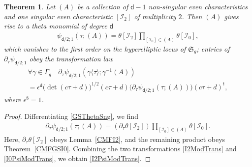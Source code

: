 \documentclass[twoside]{amsart}
\newcommand{\I}{\mathcal{I}}
\newcommand{\dd}{\textsf{d}}
\newtheorem{theo}{Theorem}[section]
\theoremstyle{definition}
\theoremstyle{plain}
\begin{document}
\begin{theo}\label{CMFGSI2}
Let $(A)$ be a collection of $\dd-1$ non-singular even characteristics 
and one singular even characteristic $[\I_2]$ of multiplicity $2$. 
Then  $(A)$ gives rise to a theta monomial of degree $\dd$
\begin{gather}\label{GSThetaSng}
\psi_{\dd/2;1}(\tau; (A)) =  \theta[\I_2] \prod_{[\I_0] \in (A)} \theta[\I_0],
\end{gather}
which vanishes to the first order on the hyperelliptic locus of $\mathfrak{S}_g$;
entries of $\partial_{\tau} \psi_{\dd/2;1}$  obey  the transformation law
\begin{multline}\label{I2PsiModTrans}
\forall \gamma \in \Gamma_g \quad
\partial_{\tau} \psi_{\dd/2;1}(\gamma\langle \tau \rangle;\gamma^{-1}(A)) \\ = 
\epsilon^{\dd} \big(\!\det (c\tau+d) \big)^{1/2} (c \tau+d)
\big( \partial_{\tau}   \psi_{\dd/2;1}(\tau; (A)) \big) (c \tau+d)^t,
\end{multline} 
where  $\epsilon^8=1$.
\end{theo}
\begin{proof}
Differentiating \eqref{GSThetaSng}, we find
\begin{gather}\label{GSThetaSngDer}
\partial_\tau \psi_{\dd/2;1}(\tau; (A)) =  (\partial_\tau \theta[\I_2]) 
\prod_{[\I_0] \in (A)} \theta[\I_0].
\end{gather}
Here, $\partial_\tau \theta[\I_2]$ obeys Lemma~\ref{CMFI2},
and the remaining product  obeys Theorem~\ref{CMFGSI0}.
Combining the two transformations \eqref{I2ModTrans} and \eqref{I0PsiModTrans},
 we obtain \eqref{I2PsiModTrans}.
\end{proof}
\end{document}
